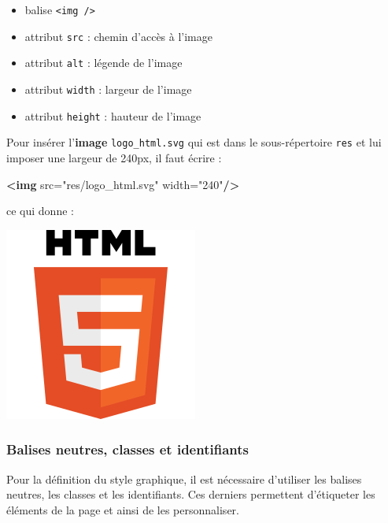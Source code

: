 \documentclass[a4paper,17pt]{extarticle}
\makeatletter
\def\maxwidth{\ifdim\Gin@nat@width>\linewidth\linewidth
    \else\Gin@nat@width\fi}
\let\Oldincludegraphics\includegraphics
\renewcommand{\includegraphics}[1]{\Oldincludegraphics[width=.8\maxwidth]{#1}}
\providecommand{\tightlist}{%
      \setlength{\itemsep}{0pt}\setlength{\parskip}{0pt}}
\newenvironment{Shaded}{}{}
\newcommand{\KeywordTok}[1]{\textcolor[rgb]{0.00,0.44,0.13}{\textbf{{#1}}}}
\newcommand{\StringTok}[1]{\textcolor[rgb]{0.25,0.44,0.63}{{#1}}}
\newcommand{\OtherTok}[1]{\textcolor[rgb]{0.00,0.44,0.13}{{#1}}}
\makeatother
\begin{document}
\begin{itemize}
\tightlist
\item
  balise \texttt{\textless{}img\ /\textgreater{}}
\item
  attribut \texttt{src} : chemin d'accès à l'image
\item
  attribut \texttt{alt} : légende de l'image
\item
  attribut \texttt{width} : largeur de l'image
\item
  attribut \texttt{height} : hauteur de l'image
\end{itemize}
\begin{exemple}
    Pour insérer l'\textbf{image} \texttt{logo\_html.svg} qui est dans le
sous-répertoire \texttt{res} et lui imposer une largeur de 240px, il
faut écrire :

\begin{Shaded}
\begin{Highlighting}[]
\KeywordTok{<img}\OtherTok{ src=}\StringTok{"res/logo_html.svg"}\OtherTok{ width=}\StringTok{"240"}\KeywordTok{/>}
\end{Highlighting}
\end{Shaded}

ce qui donne :

\includegraphics{res/logo_html.png}

            \end{exemple}
    \hypertarget{balises-neutres-classes-et-identifiants}{%
\subsubsection{Balises neutres, classes et
identifiants}\label{balises-neutres-classes-et-identifiants}}

    Pour la définition du style graphique, il est nécessaire d'utiliser les
balises neutres, les classes et les identifiants. Ces derniers
permettent d'étiqueter les éléments de la page et ainsi de les
personnaliser.
\end{document}
